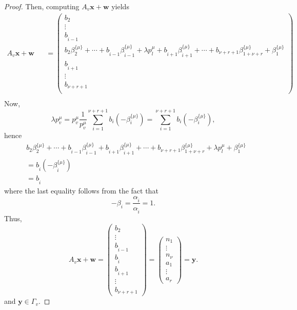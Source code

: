 \begin{proof}
Then, computing $A_{v}\mathbf{x} + \mathbf{w}$ yields
\begin{align*}
A_{v}\mathbf{x} + \mathbf{w} & 
& = \begin{pmatrix}
b_2 \\ \vdots \\ b_{\hat{i} -1} \\ 
 b_2\beta_2^{\{\mu\}} + \cdots + b_{\hat{i} - 1}\beta_{\hat{i} - 1}^{\{\mu\}} + \lambda p_l^{\mu} + b_{\hat{i} + 1}\beta_{\hat{i} + 1}^{\{\mu\}} + \cdots + b_{\nu+r+ 1}\beta_{1+\nu+r}^{\{\mu\}} + \beta_1^{\{\mu\}} \\
b_{\hat{i} +1} \\ \vdots \\ b_{\nu+r+1} \\
\end{pmatrix}\\
\end{align*}
Now, 
\[ \lambda p_v^{\mu} = p_v^{\mu}\frac{1}{p_v^{\mu}}\sum_{i = 1}^{\nu + r + 1}b_i(-\beta_i^{\{\mu\}}) = \sum_{i = 1}^{\nu + r + 1}b_i(-\beta_i^{\{\mu\}}),\]
hence
\begin{align*}
& b_2\beta_2^{\{\mu\}} + \cdots + b_{\hat{i} - 1}\beta_{\hat{i} - 1}^{\{\mu\}} + b_{\hat{i} + 1}\beta_{\hat{i} + 1}^{\{\mu\}} + \cdots + b_{\nu+r+ 1}\beta_{1+\nu+r}^{\{\mu\}} + \lambda p_l^{\mu} + \beta_1^{\{\mu\}}\\
& = b_{\hat{i}}(-\beta_{\hat{i}}^{\{\mu\}})\\
& = b_{\hat{i}}
\end{align*}
where the last equality follows from the fact that 
\[-\beta_i = \frac{\alpha_{\hat{i}}}{\alpha_{\hat{i}}} =1.\]
Thus, 
\[A_{v}\mathbf{x} + \mathbf{w} = \begin{pmatrix}
b_2 \\ \vdots \\ b_{\hat{i} -1} \\ b_{\hat{i}} \\ b_{\hat{i} +1} \\ \vdots \\ b_{\nu+r+1}
\end{pmatrix} = 
\begin{pmatrix}
n_1 \\ \vdots \\ n_{\nu} \\ a_1 \\ \vdots \\ a_r \end{pmatrix} = \mathbf{y}.\]
and $\mathbf{y} \in \Gamma_v$. 

\end{proof}


